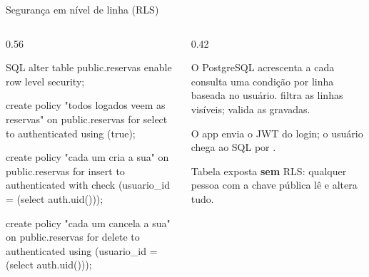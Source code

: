 \documentclass[aspectratio=169,10pt]{beamer}
\begin{document}
\begin{frame}[fragile]{Segurança em nível de linha (RLS)}
  \begin{columns}[T]
    \begin{column}{0.56\textwidth}
\begin{codigo}[title=supabase/migrations/002\_politicas.sql]{SQL}
alter table public.reservas enable row level security;

create policy "todos logados veem as reservas"
  on public.reservas for select to authenticated
  using (true);

create policy "cada um cria a sua"
  on public.reservas for insert to authenticated
  with check (usuario_id = (select auth.uid()));

create policy "cada um cancela a sua"
  on public.reservas for delete to authenticated
  using (usuario_id = (select auth.uid()));
\end{codigo}
    \end{column}
    \begin{column}{0.42\textwidth}
      \begin{definicao}
        O PostgreSQL acrescenta a cada consulta uma condição por linha baseada no usuário.  filtra as linhas visíveis;  valida as gravadas.
      \end{definicao}
      \begin{pordentro}
        O app envia o JWT do login; o usuário chega ao SQL por .
      \end{pordentro}
      \begin{erro}
        Tabela exposta \textbf{sem} RLS: qualquer pessoa com a chave pública lê e altera tudo.
      \end{erro}
    \end{column}
  \end{columns}
\end{frame}
\end{document}
